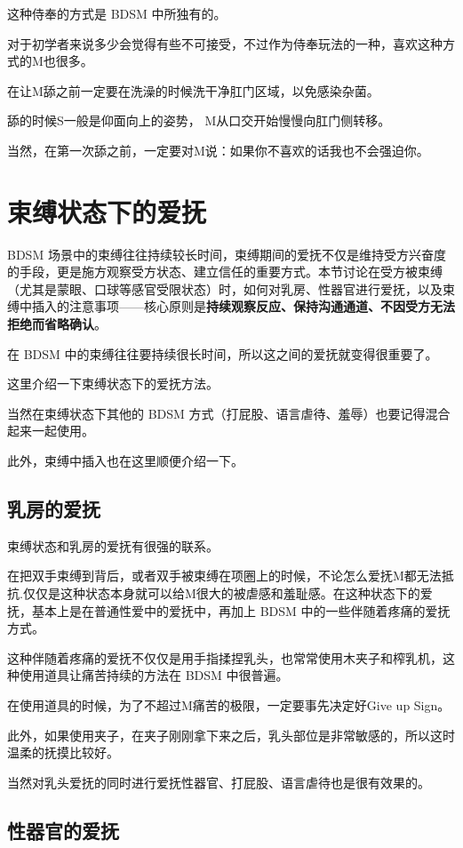 \documentclass[12pt,UTF8]{ctexbook}
\begin{document}
这种侍奉的方式是 BDSM 中所独有的。

对于初学者来说多少会觉得有些不可接受，不过作为侍奉玩法的一种，喜欢这种方式的M也很多。

在让M舔之前一定要在洗澡的时候洗干净肛门区域，以免感染杂菌。

舔的时候S一般是仰面向上的姿势， M从口交开始慢慢向肛门侧转移。

当然，在第一次舔之前，一定要对M说：如果你不喜欢的话我也不会强迫你。

\section{束缚状态下的爱抚}

BDSM 场景中的束缚往往持续较长时间，束缚期间的爱抚不仅是维持受方兴奋度的手段，更是施方观察受方状态、建立信任的重要方式。本节讨论在受方被束缚（尤其是蒙眼、口球等感官受限状态）时，如何对乳房、性器官进行爱抚，以及束缚中插入的注意事项——核心原则是\textbf{持续观察反应、保持沟通通道、不因受方无法拒绝而省略确认}。

在 BDSM 中的束缚往往要持续很长时间，所以这之间的爱抚就变得很重要了。

这里介绍一下束缚状态下的爱抚方法。

当然在束缚状态下其他的 BDSM 方式（打屁股、语言虐待、羞辱）也要记得混合起来一起使用。

此外，束缚中插入也在这里顺便介绍一下。 

\subsection{乳房的爱抚}

束缚状态和乳房的爱抚有很强的联系。

在把双手束缚到背后，或者双手被束缚在项圈上的时候，不论怎么爱抚M都无法抵抗.仅仅是这种状态本身就可以给M很大的被虐感和羞耻感。在这种状态下的爱抚，基本上是在普通性爱中的爱抚中，再加上 BDSM 中的一些伴随着疼痛的爱抚方式。

这种伴随着疼痛的爱抚不仅仅是用手指揉捏乳头，也常常使用木夹子和榨乳机，这种使用道具让痛苦持续的方法在 BDSM 中很普遍。

在使用道具的时候，为了不超过M痛苦的极限，一定要事先决定好Give up Sign。

此外，如果使用夹子，在夹子刚刚拿下来之后，乳头部位是非常敏感的，所以这时温柔的抚摸比较好。

当然对乳头爱抚的同时进行爱抚性器官、打屁股、语言虐待也是很有效果的。 

\subsection{性器官的爱抚}
\end{document}
